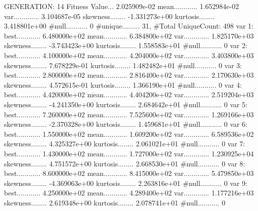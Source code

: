 \documentclass[oneside,letterpaper,titlepage]{article}
\begin{document}
\begin{Schunk}
\begin{Soutput}
GENERATION: 14
Fitness Value... 2.025909e-02
mean............ 1.652984e-02
var............. 3.104687e-05
skewness........ -1.331273e+00
kurtosis........ 3.418801e+00
#null........... 0
#unique......... 31, #Total UniqueCount: 498
var 1:
best............ 6.480000e+02
mean............ 6.384800e+02
var............. 1.825170e+03
skewness........ -3.743423e+00
kurtosis........ 1.558583e+01
#null........... 0
var 2:
best............ 4.100000e+02
mean............ 4.204000e+02
var............. 3.403800e+03
skewness........ 7.678229e-01
kurtosis........ 1.482482e+01
#null........... 0
var 3:
best............ 2.800000e+02
mean............ 2.816400e+02
var............. 2.170630e+03
skewness........ 4.572615e-01
kurtosis........ 1.366190e+01
#null........... 0
var 4:
best............ 4.420000e+02
mean............ 4.404200e+02
var............. 2.519204e+03
skewness........ -4.241350e+00
kurtosis........ 2.684642e+01
#null........... 0
var 5:
best............ 7.260000e+02
mean............ 7.525600e+02
var............. 1.269166e+03
skewness........ -2.370328e+00
kurtosis........ 1.459681e+01
#null........... 0
var 6:
best............ 1.550000e+02
mean............ 1.609200e+02
var............. 6.589536e+02
skewness........ 4.325327e+00
kurtosis........ 2.061021e+01
#null........... 0
var 7:
best............ 1.430000e+02
mean............ 1.727000e+02
var............. 1.230925e+04
skewness........ 4.751572e+00
kurtosis........ 2.668530e+01
#null........... 0
var 8:
best............ 8.600000e+02
mean............ 8.415000e+02
var............. 5.479850e+03
skewness........ -4.369063e+00
kurtosis........ 2.263816e+01
#null........... 0
var 9:
best............ 4.250000e+02
mean............ 4.289400e+02
var............. 1.177216e+03
skewness........ 2.619348e+00
kurtosis........ 2.078741e+01
#null........... 0


\end{Soutput}
\end{Schunk}
\end{document}
